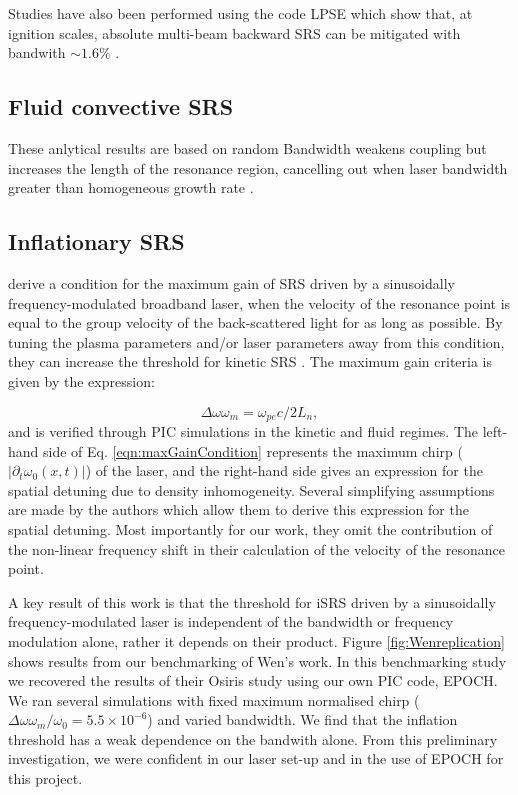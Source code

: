 Studies have also been performed using the code LPSE which show that, at ignition scales, absolute multi-beam backward SRS can be mitigated with bandwith $\sim 1.6\%$ \citep{Follett2021}.

\subsection{Fluid convective SRS}
These anlytical results are based on random
Bandwidth weakens coupling but increases the length of the resonance region, cancelling out when laser bandwidth greater than homogeneous growth rate \citep{Guzdar1991}.

\subsection{Inflationary SRS}
\citet{Wen2021} derive a condition for the maximum gain of SRS driven by a sinusoidally frequency-modulated broadband laser, when the velocity of the resonance point is equal to the group velocity of the back-scattered light for as long as possible. By tuning the plasma parameters and/or laser parameters away from this condition, they can increase the threshold for kinetic SRS \citep{Wen2021}. The maximum gain criteria is given by the expression:

\begin{equation}\label{eqn:maxGainCondition}
 \Delta\omega\omega_m = \omega_{pe}c / 2L_n,
\end{equation} and is verified through PIC simulations in the kinetic and fluid regimes. The left-hand side of Eq. \ref{eqn:maxGainCondition} represents the maximum chirp ($|\partial_t\omega_0(x,t)|$) of the laser, and the right-hand side gives an expression for the spatial detuning due to density inhomogeneity. Several simplifying assumptions are made by the authors which allow them to derive this expression for the spatial detuning. Most importantly for our work, they omit the contribution of the non-linear frequency shift in their calculation of the velocity of the resonance point. 

A key result of this work is that the threshold for iSRS driven by a sinusoidally frequency-modulated laser is independent of the bandwidth or frequency modulation alone, rather it depends on their product. Figure \ref{fig:Wenreplication} shows results from our benchmarking of Wen's work. In this benchmarking study we recovered the results of their Osiris study using our own PIC code, EPOCH. We ran several simulations with fixed maximum normalised chirp ($\Delta\omega \omega_m / \omega_0=5.5\times10^{-6}$) and varied bandwidth. We find that the inflation threshold has a weak dependence on the bandwith alone. From this preliminary investigation, we were confident in our laser set-up and in the use of EPOCH for this project.


